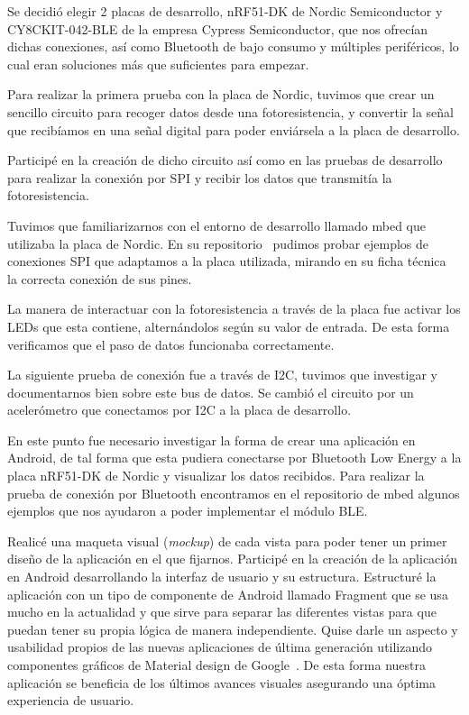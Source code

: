 Se decidió elegir 2 placas de desarrollo, nRF51-DK de Nordic Semiconductor y CY8CKIT-042-BLE de la empresa Cypress Semiconductor, que nos ofrecían dichas conexiones, así como Bluetooth de bajo consumo y múltiples periféricos, lo cual eran soluciones más que suficientes para empezar.

Para realizar la primera prueba con la placa de Nordic, tuvimos que crear un sencillo circuito para recoger datos desde una fotoresistencia, y convertir la señal que recibíamos en una señal digital para poder enviársela a la placa de desarrollo.

Participé en la creación de dicho circuito así como en las pruebas de desarrollo para realizar la conexión por SPI y recibir los datos que transmitía la fotoresistencia.

Tuvimos que familiarizarnos con el entorno de desarrollo llamado mbed que utilizaba la placa de Nordic. En su repositorio~\cite{repoMbed} pudimos probar ejemplos de conexiones SPI que adaptamos a la placa utilizada, mirando en su ficha técnica~\cite{NordicDatasheet} la correcta conexión de sus pines.

La manera de interactuar con la fotoresistencia a través de la placa fue activar los LEDs que esta contiene, alternándolos según su valor de entrada. De esta forma verificamos que el paso de datos funcionaba correctamente.

La siguiente prueba de conexión fue a través de I2C, tuvimos que investigar y documentarnos bien sobre este bus de datos. Se cambió el circuito por un acelerómetro que conectamos por I2C a la placa de desarrollo.

En este punto fue necesario investigar la forma de crear una aplicación en Android, de tal forma que esta pudiera conectarse por Bluetooth Low Energy a la placa nRF51-DK de Nordic y visualizar los datos recibidos. Para realizar la prueba de conexión por Bluetooth encontramos en el repositorio de mbed algunos ejemplos que nos ayudaron a poder implementar el módulo BLE.

Realicé una maqueta visual (\textit{mockup}) de cada vista para poder tener un primer diseño de la aplicación en el que fijarnos.
Participé en la creación de la aplicación en Android desarrollando la interfaz de usuario y su estructura. Estructuré la aplicación con un tipo de componente de Android llamado Fragment que se usa mucho en la actualidad y que sirve para separar las diferentes vistas para que puedan tener su propia lógica de manera independiente. Quise darle un aspecto y usabilidad propios de las nuevas aplicaciones de última generación utilizando componentes gráficos de Material design de Google~\cite{MaterialDesignGoogle}. De esta forma nuestra aplicación se beneficia de los últimos avances visuales asegurando una óptima experiencia de usuario. 

